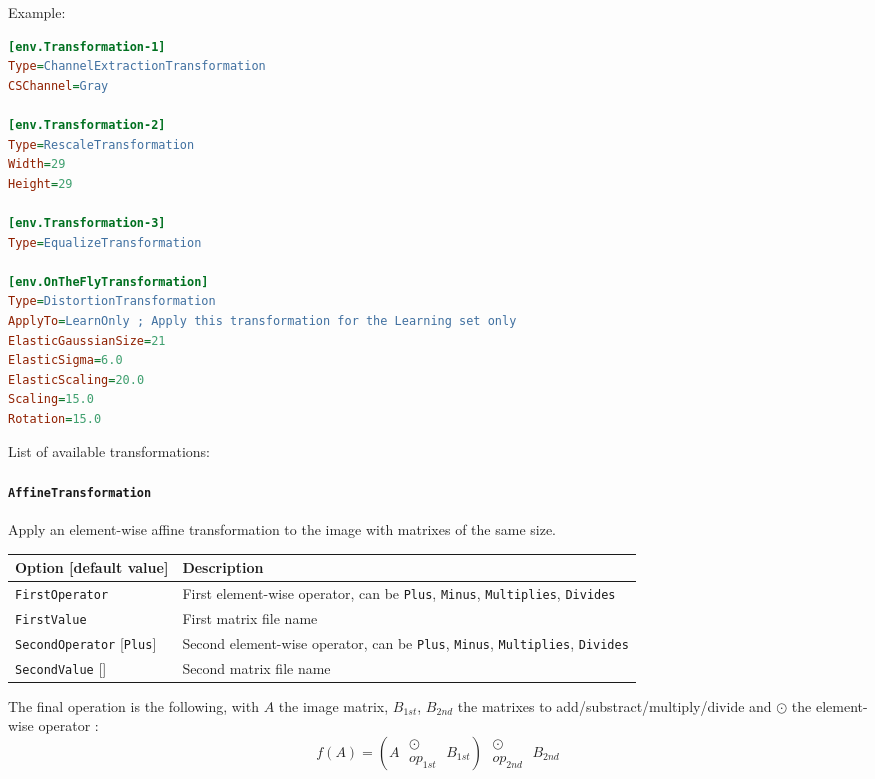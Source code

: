 \documentclass[a4paper,11pt,oneside]{article}
\begin{document}
Example:
\begin{lstlisting}[language=ini]
[env.Transformation-1]
Type=ChannelExtractionTransformation
CSChannel=Gray

[env.Transformation-2]
Type=RescaleTransformation
Width=29
Height=29

[env.Transformation-3]
Type=EqualizeTransformation

[env.OnTheFlyTransformation]
Type=DistortionTransformation
ApplyTo=LearnOnly ; Apply this transformation for the Learning set only
ElasticGaussianSize=21
ElasticSigma=6.0
ElasticScaling=20.0
Scaling=15.0
Rotation=15.0
\end{lstlisting}


List of available transformations:

\paragraph{\texorpdfstring{%
\lstinline[basicstyle=\ttfamily\bfseries]!AffineTransformation!}
{AffineTransformation}}
Apply an element-wise affine transformation to the image with matrixes of the
 same size.

\begin{center}
 \begin{tabular}{| p{5cm} | p{10cm} | }
 \hline
 Option [default value] & Description\\
 \hline\hline
  \cellcolor{requiredcolor}
  \lstinline!FirstOperator! & First element-wise operator, can be
  \lstinline!Plus!, \lstinline!Minus!, \lstinline!Multiplies!,
  \lstinline!Divides!  \\
  \cellcolor{requiredcolor}
  \lstinline!FirstValue! & First matrix file name \\
  \lstinline!SecondOperator! [\lstinline!Plus!] & Second element-wise operator,
  can be \lstinline!Plus!, \lstinline!Minus!, \lstinline!Multiplies!,
  \lstinline!Divides!  \\
  \lstinline!SecondValue! [] & Second matrix file name \\
 \hline
\end{tabular}
\end{center}

The final operation is the following, with $A$ the image matrix, $B_{1st}$,
$B_{2nd}$ the matrixes to add/substract/multiply/divide and $\odot$ the
element-wise operator :
\[f(A) = \left(A\;\substack{\odot\\op_{1st}}\;B_{1st}\right)\;
\substack{\odot\\op_{2nd}}\;B_{2nd}\]
\end{document}
